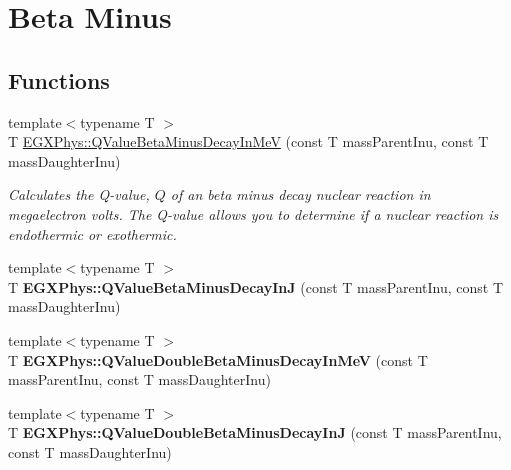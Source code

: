 \hypertarget{group___e_g_x_phys-_q_value-_beta_minus}{}\section{Beta Minus}
\label{group___e_g_x_phys-_q_value-_beta_minus}
\subsection*{Functions}
\begin{DoxyCompactItemize}
\item 
{\footnotesize template$<$typename T $>$ }\\T \mbox{\hyperlink{group___e_g_x_phys-_q_value-_beta_minus_gaac1374ce9ba39bef416f34298708bda9}{E\+G\+X\+Phys\+::\+Q\+Value\+Beta\+Minus\+Decay\+In\+MeV}} (const T mass\+Parent\+Inu, const T mass\+Daughter\+Inu)
\begin{DoxyCompactList}\small\item\em Calculates the Q-\/value, $Q$ of an beta minus decay nuclear reaction in megaelectron volts. The Q-\/value allows you to determine if a nuclear reaction is endothermic or exothermic. \end{DoxyCompactList}\item 
\mbox{\label{group___e_g_x_phys-_q_value-_beta_minus_gae9a4a9f4c6e0f555e20c3144dd7329fc}} 
{\footnotesize template$<$typename T $>$ }\\T {\bfseries E\+G\+X\+Phys\+::\+Q\+Value\+Beta\+Minus\+Decay\+InJ} (const T mass\+Parent\+Inu, const T mass\+Daughter\+Inu)
\item 
\mbox{\label{group___e_g_x_phys-_q_value-_beta_minus_ga2678563115405a056c6bdccc9f2a9232}} 
{\footnotesize template$<$typename T $>$ }\\T {\bfseries E\+G\+X\+Phys\+::\+Q\+Value\+Double\+Beta\+Minus\+Decay\+In\+MeV} (const T mass\+Parent\+Inu, const T mass\+Daughter\+Inu)
\item 
\mbox{\label{group___e_g_x_phys-_q_value-_beta_minus_ga5be6923812a1a701ed38965329dd6297}} 
{\footnotesize template$<$typename T $>$ }\\T {\bfseries E\+G\+X\+Phys\+::\+Q\+Value\+Double\+Beta\+Minus\+Decay\+InJ} (const T mass\+Parent\+Inu, const T mass\+Daughter\+Inu)
\end{DoxyCompactItemize}


